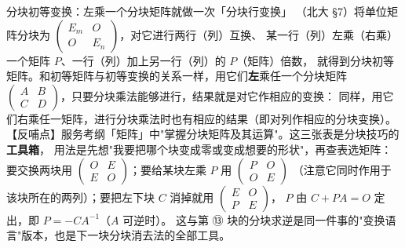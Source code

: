 \begin{fdeep}{分块初等变换：左乘一个分块矩阵就做一次「分块行变换」}
（北大 §7）将单位矩阵分块为 $\begin{pmatrix}E_m&O\\O&E_n\end{pmatrix}$，对它进行两行（列）互换、
某一行（列）左乘（右乘）一个矩阵 $P$、一行（列）加上另一行（列）的 $P$（矩阵）倍数，
就得到分块初等矩阵。和初等矩阵与初等变换的关系一样，用它们\textbf{左}乘任一个分块矩阵
$\begin{pmatrix}A&B\\C&D\end{pmatrix}$，只要分块乘法能够进行，结果就是对它作相应的变换：
同样，用它们右乘任一矩阵，进行分块乘法时也有相应的结果（即对列作相应的分块变换）。
【反哺点】服务考纲「矩阵」中"掌握分块矩阵及其运算"。这三张表是分块技巧的\textbf{工具箱}，
用法是先想"我要把哪个块变成零或变成想要的形状"，再查表选矩阵：要交换两块用
$\begin{pmatrix}O&E\\E&O\end{pmatrix}$；要给某块左乘 $P$ 用 $\begin{pmatrix}P&O\\O&E\end{pmatrix}$
（注意它同时作用于该块所在的两列）；要把左下块 $C$ 消掉就用 $\begin{pmatrix}E&O\\P&E\end{pmatrix}$，
$P$ 由 $C+PA=O$ 定出，即 $P=-CA^{-1}$（$A$ 可逆时）。
这与第 ⑬ 块的分块求逆是同一件事的"变换语言"版本，也是下一块分块消去法的全部工具。
\end{fdeep}


